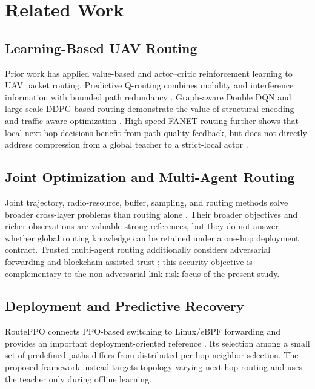 \documentclass[preprint,12pt]{elsarticle}
\begin{document}
\section{Related Work}

\subsection{Learning-Based UAV Routing}

Prior work has applied value-based and actor--critic reinforcement learning to UAV packet routing. Predictive Q-routing combines mobility and interference information with bounded path redundancy \cite{Dong2026Predictive}. Graph-aware Double DQN and large-scale DDPG-based routing demonstrate the value of structural encoding and traffic-aware optimization \cite{Zhang2025Spatiotemporal,Zhang2026LargeScale}. High-speed FANET routing further shows that local next-hop decisions benefit from path-quality feedback, but does not directly address compression from a global teacher to a strict-local actor \cite{Shou2026Adaptive}.

\subsection{Joint Optimization and Multi-Agent Routing}

Joint trajectory, radio-resource, buffer, sampling, and routing methods solve broader cross-layer problems than routing alone \cite{Alam2024JTFR,Wu2026AoI}. Their broader objectives and richer observations are valuable strong references, but they do not answer whether global routing knowledge can be retained under a one-hop deployment contract. Trusted multi-agent routing additionally considers adversarial forwarding and blockchain-assisted trust \cite{Jia2025Trusted}; this security objective is complementary to the non-adversarial link-risk focus of the present study.

\subsection{Deployment and Predictive Recovery}

RoutePPO connects PPO-based switching to Linux/eBPF forwarding and provides an important deployment-oriented reference \cite{Curmen2026RoutePPO}. Its selection among a small set of predefined paths differs from distributed per-hop neighbor selection. The proposed framework instead targets topology-varying next-hop routing and uses the teacher only during offline learning.
\end{document}
